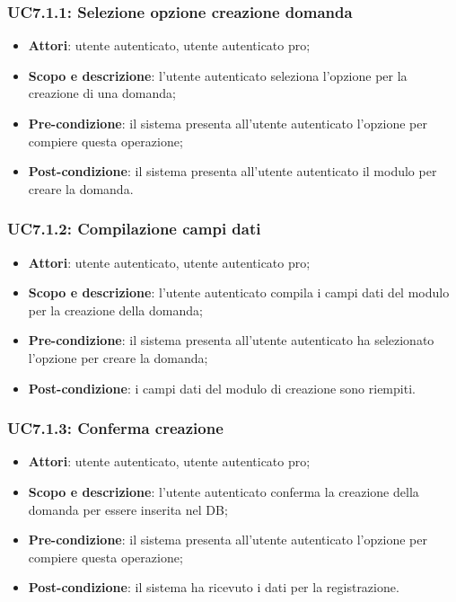 	\subsubsection{UC7.1.1: Selezione opzione creazione domanda}
	\begin{itemize}
		\item
			\textbf{Attori}: utente autenticato, utente autenticato pro;
		\item
			\textbf{Scopo e descrizione}: l'utente autenticato seleziona l'opzione per la creazione di una domanda;
		\item		
			\textbf{Pre-condizione}: il sistema presenta all'utente autenticato l'opzione per compiere questa operazione;
		\item
			\textbf{Post-condizione}: il sistema presenta all'utente autenticato il modulo per creare la domanda.
	\end{itemize}	
	\subsubsection{UC7.1.2: Compilazione campi dati}
	\begin{itemize}
		\item
			\textbf{Attori}: utente autenticato, utente autenticato pro;
		\item
			\textbf{Scopo e descrizione}: l'utente autenticato compila i campi dati del modulo per la creazione della domanda;
		\item		
			\textbf{Pre-condizione}: il sistema presenta all'utente autenticato ha selezionato l'opzione per creare la domanda;
		\item
			\textbf{Post-condizione}: i campi dati del modulo di creazione sono riempiti.
	\end{itemize}	
	\subsubsection{UC7.1.3: Conferma creazione}
	\begin{itemize}
		\item
			\textbf{Attori}: utente autenticato, utente autenticato pro;
		\item
			\textbf{Scopo e descrizione}: l'utente autenticato conferma la creazione della domanda per essere inserita nel DB;
		\item		
			\textbf{Pre-condizione}: il sistema presenta all'utente autenticato l'opzione per compiere questa operazione;
		\item
			\textbf{Post-condizione}: il sistema ha ricevuto i dati per la registrazione.
	\end{itemize}	

